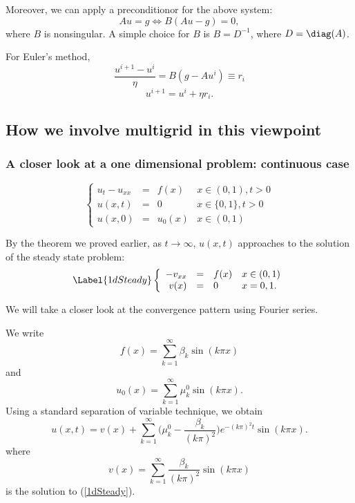 Moreover, we can apply a preconditionor for the above system:
\begin{equation}
Au=g \Leftrightarrow B(Au-g)=0, 
\end{equation} 
where $B$ is nonsingular. 
A simple choice for $B$ is $B=D^{-1}$, where $D=\diag(A)$.

For Euler's method,
\begin{equation}\frac{u^{i+1}-u^i}{\eta}=B(g-Au^i)\equiv r_i \end{equation}
\begin{equation} u^{i+1}=u^i+\eta r_i. \end{equation}

\subsection{How we involve multigrid in this viewpoint}

\subsubsection{A closer look at a one dimensional problem: continuous case}
\begin{equation}
\left\{
\begin{array}{rcll}
u_t-u_{xx} & = & f(x) & x\in (0,1), t>0\\
u(x,t) & = & 0 & x\in \{0,1\}, t>0\\
u(x,0) & = & u_0(x) & x\in (0,1)
\end{array}
\right.
\end{equation}

By the theorem we proved earlier, as $t\rightarrow \infty$, $u(x,t)$ approaches
to the solution of the steady state problem:
\begin{equation}\Label{1dSteady}
\left\{
\begin{array}{rcll}
-v_{xx} & = & f(x) & x\in (0,1)\\
v(x) & = & 0 & x=0,1.
\end{array}
\right.
\end{equation}

We will take a closer look at the convergence pattern using Fourier series.

We write
$$
f(x)=\sum_{k=1}^\infty\beta_k\sin(k\pi x)
$$
and
$$
u_0(x)=\sum_{k=1}^\infty\mu^0_k\sin(k\pi x).
$$
Using a standard separation of variable technique, we obtain
$$
u(x,t)=v(x)+\sum_{k=1}^\infty\bigg(\mu^0_k-\frac{\beta_k}{(k\pi)^2}\bigg)
e^{-(k\pi)^2t}\sin(k\pi x).
$$
where
$$
v(x)=\sum_{k=1}^\infty \frac{\beta_k}{(k\pi)^2}\sin(k\pi x)
$$
is the solution to (\ref{1dSteady}).


